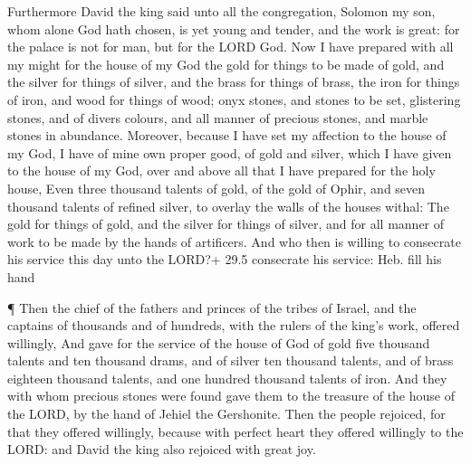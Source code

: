  Furthermore David the king said unto all the congregation,
Solomon my son, whom alone God hath chosen, is yet young and tender, and
the work is great: for the palace is not for man, but for the LORD God.
 Now I have prepared with all my might for the house of my
God the gold for things to be made of gold, and the silver for things of
silver, and the brass for things of brass, the iron for things of iron,
and wood for things of wood; onyx stones, and stones to be set,
glistering stones, and of divers colours, and all manner of precious
stones, and marble stones in abundance.  Moreover, because I
have set my affection to the house of my God, I have of mine own proper
good, of gold and silver, which I have given to the house of my God,
over and above all that I have prepared for the holy house, 
Even three thousand talents of gold, of the gold of Ophir, and seven
thousand talents of refined silver, to overlay the walls of the houses
withal:  The gold for things of gold, and the silver for
things of silver, and for all manner of work to be made by the hands of
artificers. And who then is willing to consecrate his service this day
unto the LORD?+ 29.5 consecrate his service: Heb. fill his hand

 ¶ Then the chief of the fathers and princes of the tribes
of Israel, and the captains of thousands and of hundreds, with the
rulers of the king's work, offered willingly,  And gave for
the service of the house of God of gold five thousand talents and ten
thousand drams, and of silver ten thousand talents, and of brass
eighteen thousand talents, and one hundred thousand talents of iron.
 And they with whom precious stones were found gave them to
the treasure of the house of the LORD, by the hand of Jehiel the
Gershonite.  Then the people rejoiced, for that they offered
willingly, because with perfect heart they offered willingly to the
LORD: and David the king also rejoiced with great joy.


